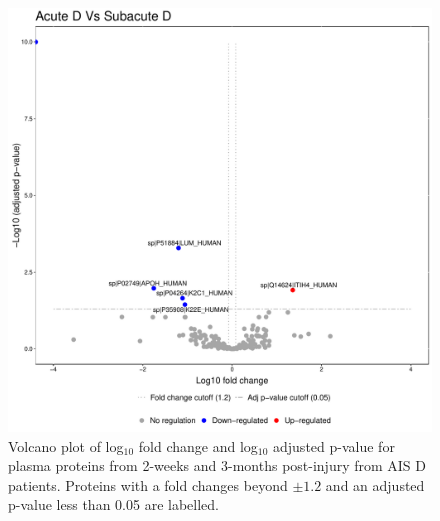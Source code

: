 \documentclass[9pt,lineno]{elife}
\begin{document}
\begin{figure}
\includegraphics[width=1\linewidth]{figures/openms_protein_quantification/label_free/volcano_plots/openms_volcano_plot_2021-08-10_0022} \caption{Volcano plot of log\(_10\) fold change and log\(_10\) adjusted p-value for plasma proteins from 2-weeks and 3-months post-injury from AIS D patients. Proteins with a fold changes beyond \(\pm 1.2\) and an adjusted p-value less than 0.05 are labelled.}\label{fig:volc-plot-acute-d-vs-subacute-d}
\end{figure}
\end{document}
